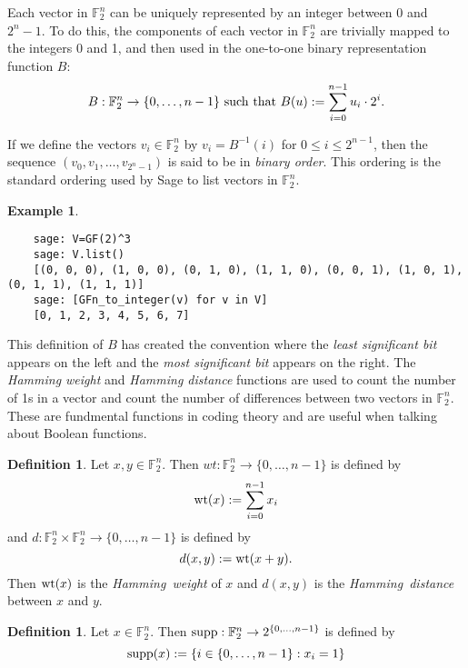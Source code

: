 \documentclass[english]{article}
\def\gftwo{\mathbb{F}_2}
\theoremstyle{plain}
\theoremstyle{definition}
\newtheorem{definition}[theorem]{Definition}%
\newtheorem{example}[theorem]{Example}
\theoremstyle{remark}
\begin{document}
\par Each vector in $\gftwo^n$ can be uniquely represented by an integer
between $0$ and $2^n-1$. To do this, the components of each vector in
$\gftwo^n$ are trivially mapped to the integers 0 and 1, and then used in
the one-to-one binary representation function $B$:
\begin{equation}
  B:\gftwo^n\rightarrow\{0,\dots,n-1\}\ \allowbreak
  {\rm such\ that }\ \allowbreak B(u) := \sum_{i=0}^{n-1}u_i\cdot2^i.
\end{equation}

\par If we define the vectors $v_i\in\gftwo^n$ by $v_i=B^{-1}(i)$
for $0\leq i\leq2^{n-1}$, then the sequence $(v_0,v_1,\allowbreak \dots,
\allowbreak v_{2^n-1})$ is said to be in {\em binary order}. This
ordering is the standard ordering used by Sage to list vectors in $\gftwo^n$.

\begin{example}
  \ 
  \begin{lstlisting}
    sage: V=GF(2)^3
    sage: V.list()
    [(0, 0, 0), (1, 0, 0), (0, 1, 0), (1, 1, 0), (0, 0, 1), (1, 0, 1), (0, 1, 1), (1, 1, 1)]
    sage: [GFn_to_integer(v) for v in V]
    [0, 1, 2, 3, 4, 5, 6, 7]
  \end{lstlisting}
\end{example}

\par This definition of $B$ has created the convention where the
{\em least significant bit} appears on the left and the 
{\em most significant bit} appears on the right. The {\it Hamming weight}
and {\it Hamming distance} functions are used to count the number of 1s in a
vector and count the number of differences between two vectors in
$\gftwo^n$. These are fundmental functions in coding theory and are useful
when talking about Boolean functions.

\begin{definition}\label{def:Hamming}
  Let $x,y\in\gftwo^n$. Then $wt:\gftwo^n\rightarrow\{0,\dots,n-1\}$
  is defined by
  \[
    {\rm wt}(x):=\sum_{i=0}^{n-1}x_i
  \]
  and $d:\gftwo^n\times\gftwo^n\rightarrow\{0,\dots,n-1\}$ is defined by
  \[
    d(x,y):={\rm wt}(x+y).
  \]
  Then ${\rm wt}(x)$ is the {\em Hamming\ weight} of $x$ and $d(x,y)$ is the
  {\em Hamming\ distance} between $x$ and $y$.
\end{definition}

\begin{definition}
\label{def:support}
  Let $x\in\gftwo^n$. Then ${\rm supp}:\gftwo^n\rightarrow\allowbreak
  2^{\{0,\dots,n-1\}}$ is defined by
  \[
    {\rm supp}(x):=\{i\in\{0,\dots,n-1\}:x_i=1\}
  \]
\end{definition}
\end{document}
